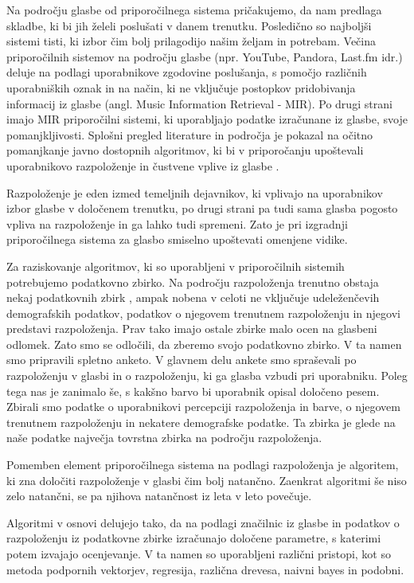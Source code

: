 \documentclass[a4paper, 12pt]{book}
\begin{document}
{Na področju glasbe od priporočilnega sistema pričakujemo, da nam predlaga skladbe, ki bi jih želeli poslušati v danem trenutku. Posledično so najboljši sistemi tisti, ki izbor čim bolj prilagodijo našim željam in potrebam. Večina priporočilnih sistemov na področju glasbe (npr. YouTube, Pandora, Last.fm idr.) deluje na podlagi uporabnikove zgodovine poslušanja, s pomočjo različnih uporabniških oznak in na način, ki ne vključuje postopkov pridobivanja informacij iz glasbe (angl. Music Information Retrieval - MIR). Po drugi strani imajo MIR priporočilni sistemi, ki uporabljajo podatke izračunane iz glasbe, svoje pomanjkljivosti. Splošni pregled literature in področja je pokazal na očitno pomanjkanje javno dostopnih algoritmov, ki bi v priporočanju upoštevali uporabnikovo razpoloženje in čustvene vplive iz glasbe \cite{JaeSikLee2006, Song2012, chen2001music}.  

Razpoloženje je eden izmed temeljnih dejavnikov, ki vplivajo na uporabnikov izbor glasbe v določenem trenutku, po drugi strani pa tudi sama glasba pogosto vpliva na razpoloženje in ga lahko tudi spremeni. Zato je pri izgradnji priporočilnega sistema za glasbo smiselno upoštevati omenjene vidike.

Za raziskovanje algoritmov, ki so uporabljeni v priporočilnih sistemih potrebujemo podatkovno zbirko. Na področju razpoloženja trenutno obstaja nekaj podatkovnih zbirk \cite{Eerola2010, schmidt2011modeling, turnbull2008semantic, schuller2010mister, panda2013multi}, ampak nobena v celoti ne vključuje udeleženčevih demografskih podatkov, podatkov o njegovem trenutnem razpoloženju in njegovi predstavi razpoloženja. Prav tako imajo ostale zbirke malo ocen na glasbeni odlomek. Zato smo se odločili, da zberemo svojo podatkovno zbirko. V ta namen smo pripravili spletno anketo. V glavnem delu ankete smo spraševali po razpoloženju v glasbi in o razpoloženju, ki ga glasba vzbudi pri uporabniku. Poleg tega nas je zanimalo še, s kakšno barvo bi uporabnik opisal določeno pesem. Zbirali smo podatke o uporabnikovi percepciji razpoloženja in barve, o njegovem trenutnem razpoloženju in nekatere demografske podatke. Ta zbirka je glede na naše podatke največja tovrstna zbirka na področju razpoloženja.

Pomemben element priporočilnega sistema na podlagi razpoloženja je algoritem, ki zna določiti razpoloženje v glasbi čim bolj natančno. Zaenkrat algoritmi še niso zelo natančni, se pa njihova natančnost iz leta v leto povečuje.

Algoritmi v osnovi delujejo tako, da na podlagi značilnic iz glasbe in podatkov o razpoloženju iz podatkovne zbirke izračunajo določene parametre, s katerimi potem izvajajo ocenjevanje. V ta namen so uporabljeni različni pristopi, kot so metoda podpornih vektorjev, regresija, različna drevesa, naivni bayes in podobni. 

}
\end{document}
